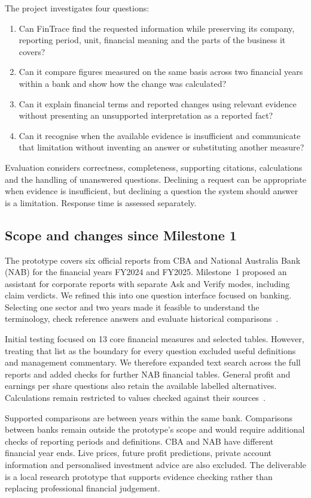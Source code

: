 The project investigates four questions:
\begin{enumerate}
\item Can FinTrace find the requested information while preserving its company, reporting period, unit, financial meaning and the parts of the business it covers?
\item Can it compare figures measured on the same basis across two financial years within a bank and show how the change was calculated?
\item Can it explain financial terms and reported changes using relevant evidence without presenting an unsupported interpretation as a reported fact?
\item Can it recognise when the available evidence is insufficient and communicate that limitation without inventing an answer or substituting another measure?
\end{enumerate}
Evaluation considers correctness, completeness, supporting citations, calculations and the handling of unanswered questions. Declining a request can be appropriate when evidence is insufficient, but declining a question the system should answer is a limitation. Response time is assessed separately.

\subsection{Scope and changes since Milestone 1}
The prototype covers six official reports from CBA and National Australia Bank (NAB) for the financial years FY2024 and FY2025. Milestone~1 proposed an assistant for corporate reports with separate Ask and Verify modes, including claim verdicts. We refined this into one question interface focused on banking. Selecting one sector and two years made it feasible to understand the terminology, check reference answers and evaluate historical comparisons~\cite{fintraceMilestone2026,fintraceSources2026}.

Initial testing focused on 13 core financial measures and selected tables. However, treating that list as the boundary for every question excluded useful definitions and management commentary. We therefore expanded text search across the full reports and added checks for further NAB financial tables. General profit and earnings per share questions also retain the available labelled alternatives. Calculations remain restricted to values checked against their sources~\cite{fintraceCoverage2026,fintraceBroad2026}.

Supported comparisons are between years within the same bank. Comparisons between banks remain outside the prototype's scope and would require additional checks of reporting periods and definitions. CBA and NAB have different financial year ends. Live prices, future profit predictions, private account information and personalised investment advice are also excluded. The deliverable is a local research prototype that supports evidence checking rather than replacing professional financial judgement.
